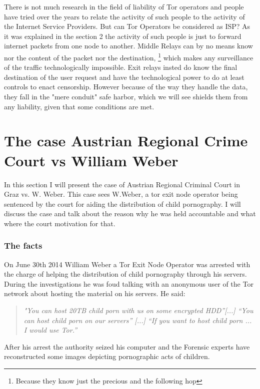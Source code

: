 \documentclass[runningheads,a4paper]{llncs}
\begin{document}
There is not much research in the field of liability of Tor operators and people have tried over the years to relate the activity of such people to the activity of the Internet Service Providers. But can Tor Operators be considered as ISP?
As it was explained in the section 2 the activity of such people is just to forward internet packets from one node to another. Middle Relays can by no means know nor the content of the packet nor the destination, 
\footnote{Because they know just the precious and the following hop}
which makes any surveillance  of the traffic technologically impossible. Exit relays insted do know the final destination of the user request and have the technological power to do at least controls to enact censorship. However because of the way they handle the data, they fall in the "mere conduit" safe harbor, which we will see shields them from any liability, given that some conditions are met. 

\section{The case Austrian Regional Crime Court vs William Weber}\label{weber_case}
In this section I will present the case of Austrian Regional Criminal Court in Graz vs. W. Weber. This case sees W.Weber, a tor exit node operator being sentenced by the court for aiding the distribution of child pornography. I will discuss the case and talk about the reason why he was held accountable and what where the court motivation for that.

\subsubsection{The facts}
On June 30th 2014 William Weber a Tor Exit Node Operator was arrested with the charge of helping the distribution of child pornography through his servers.
During the investigations he was foud talking with an anonymous user of the Tor network about hosting the material on his servers. He said: 

\begin{quote}
    \textit{ "You can host 20TB child porn with us on some encrypted HDD”[...] “You can host child porn on our servers” [...] “If you want to host child porn ... I would use Tor.”}
\end{quote}

After his arrest the authority seized his computer and the Forensic experts have reconstructed some images depicting pornographic acts of children.
\end{document}
